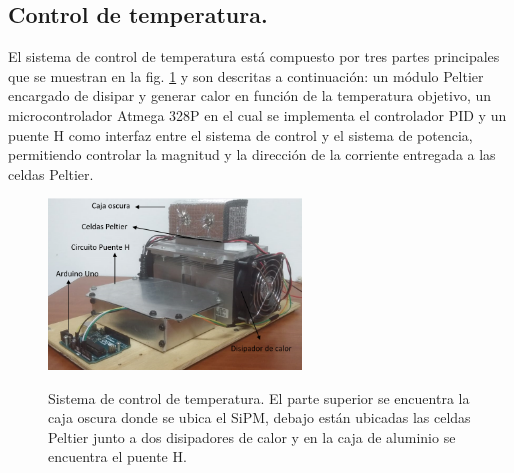 \subsection{Control de temperatura.}
El sistema de control de temperatura está compuesto por tres partes principales que se muestran en la fig. \ref{fig:Temp_system} y son descritas a continuación: un módulo Peltier encargado de disipar y generar calor en función de la temperatura objetivo, un microcontrolador Atmega 328P en el cual se implementa el controlador PID y  un puente H como interfaz entre el sistema de control y el sistema de potencia, permitiendo controlar la magnitud y la dirección de la corriente entregada a las celdas Peltier.
\begin{figure}[h!]
\begin{centering}
    \caption{Sistema de control de temperatura. El parte superior se encuentra la caja oscura donde se ubica el SiPM, debajo están ubicadas las celdas Peltier junto a dos disipadores de calor y en la caja de aluminio se encuentra el puente H.}
    \includegraphics[width=0.6\textwidth]{Images/Sistema_termico}
    \label{fig:Temp_system}
  \par\end{centering}
\end{figure}
